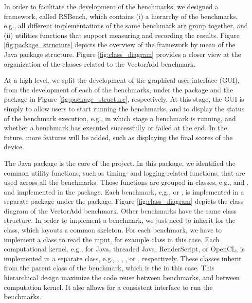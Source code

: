 In order to facilitate the development of the benchmarks, we designed a
framework, called RSBench, which contains (i) a hierarchy of the benchmarks, e.g.,
all different implementations of the same benchmark are group together, and
(ii) utilities functions that support measuring and recording the results.
Figure \ref{fig:package_structure} depicts the overview of the framework by mean
of the Java package structure. Figure \ref{fig:class_diagram} provides a closer
view at the organization of the classes related to the VectorAdd benchmark.

At a high level, we split the development of the graphical user interface (GUI),
from the development of each of the benchmarks, under the  package and
the  package in Figure \ref{fig:package_structure}, respectively.
At this stage, the GUI is simply to allow users to start running the benchmarks,
and to display the status of the benchmark execution, e.g., in which stage a
benchmark is running, and whether a benchmark has executed successfully or
failed at the end. In the future, more features will be added, such as
displaying the final scores of the device.

The  Java package is the core of the project. In this package, we
identified the common utility functions, such as timing- and logging-related
functions, that are used across all the benchmarks. Those functions are grouped
in classes, e.g.,  and , and implemented in the
 package. Each benchmark, e,g.,  or , is
implemented in a separate package under the  package.  Figure
\ref{fig:class_diagram} depicts the class diagram of the VectorAdd benchmark.
Other benchmarks have the same class structure. In order to implement a
benchmark, we just need to inherit for the  class, which
layouts a common skeleton. For each benchmark, we have to implement a class to
read the input, for example  class in this case. Each
computational kernel, e.g., for Java, threaded Java, RenderScript, or OpenCL, is
implemented in a separate class, e.g., ,
, , or ,
respectively. These classes inherit from the parent class of the benchmark,
which is the  in this case. This hierarchical design
maximize the code reuse between benchmarks, and between computation kernel.  It
also allows for a consistent interface to run the benchmarks.


